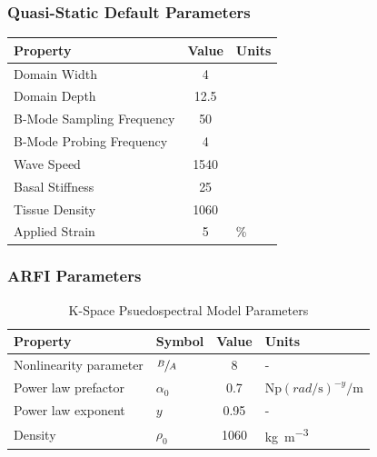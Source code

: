 \documentclass{beamer}
\begin{document}
		\begin{frame}[label=quasiDefaultParams]
			\frametitle{Quasi-Static Default Parameters}
			\centering
			\scriptsize
			\begin{table}
				\begin{tabular}{lSs[table-unit-alignment = left]}
					\toprule
					Property & {Value} & Units \\
					\midrule
					Domain Width & 4 & \cm \\
					Domain Depth & 12.5 & \cm \\
					B-Mode Sampling Frequency & 50 & \MHz \\
					B-Mode Probing Frequency & 4 & \MHz \\
					Wave Speed & 1540 & \metre\per\second \\
					Basal Stiffness & 25 & \kPa \\
					Tissue Density & 1060 & \kg\per\metre\cubed \\
					Applied Strain & 5 & \% \\
					\bottomrule
				\end{tabular}
			\end{table}
		\end{frame}

		\begin{frame}[allowframebreaks,label=arfiParameters]
			\frametitle{ARFI Parameters}
			\centering
			\scriptsize
			\begin{table}
				\caption{K-Space Psuedospectral Model Parameters}
				\begin{tabular}{llSs[table-unit-alignment = left]}
					\toprule
					Property & Symbol & {Value} & Units \\
					\midrule
					Nonlinearity parameter & $\sfrac{B}{A}$ & 8 & - \\
					Power law prefactor & $\alpha_0$ & 0.7 & $\si{\neper} \left(\si{rad\per\s}\right)^{-y} \si{\per\m}$ \\
					Power law exponent & $y$ & 0.95 & - \\
					Density & $\rho_0$ & 1060 & \si{\kg\per\m\cubed} \\
					\bottomrule
				\end{tabular}
			\end{table}
		\end{frame}
\end{document}
